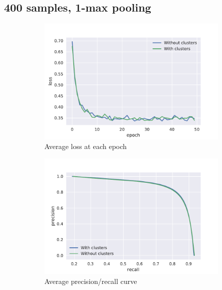 \subsection{400 samples, 1-max pooling}
\begin{figure}[htb]
  \centering
  \begin{subfigure}[b]{0.49\textwidth} 
    \centering
    \includegraphics[width=\textwidth]{figures/results/datasize/200pos_10fold_default_losses.pdf}
    \caption{Average loss at each epoch}
  \end{subfigure}
  \begin{subfigure}[b]{0.49\textwidth}
	\centering
    \includegraphics[width=\textwidth]{figures/results/datasize/200pos_10fold_default_pr.pdf}
    \caption{Average precision/recall curve}
  \end{subfigure}
  \begin{subfigure}[b]{0.49\textwidth}

\end{subfigure}
\end{figure}
